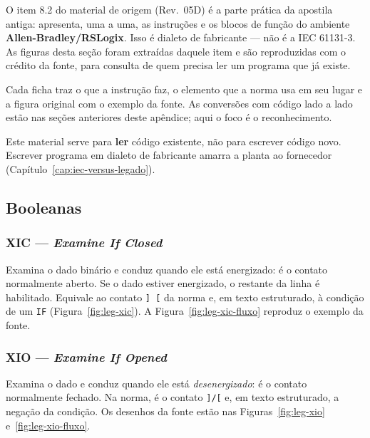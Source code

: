 O item 8.2 do material de origem (Rev.~05D) é a parte prática da apostila antiga: apresenta, uma a uma,
as instruções e os blocos de função do ambiente \textbf{Allen-Bradley/RSLogix}. Isso é dialeto de
fabricante --- não é a IEC 61131-3. As figuras desta seção foram extraídas daquele item e são
reproduzidas com o crédito da fonte, para consulta de quem precisa ler um programa que já existe.

Cada ficha traz o que a instrução faz, o elemento que a norma usa em seu lugar e a figura original com
o exemplo da fonte. As conversões com código lado a lado estão nas seções anteriores deste apêndice;
aqui o foco é o reconhecimento.

\begin{atencao}
Este material serve para \textbf{ler} código existente, não para escrever código novo. Escrever
programa em dialeto de fabricante amarra a planta ao fornecedor
(Capítulo~\ref{cap:iec-versus-legado}).
\end{atencao}

\subsection{Booleanas}

\subsubsection{XIC --- \emph{Examine If Closed}}

Examina o dado binário e conduz quando ele está energizado: é o contato normalmente aberto. Se o dado
estiver energizado, o restante da linha é habilitado. Equivale ao contato \texttt{] [} da norma e, em
texto estruturado, à condição de um \texttt{IF} (Figura~\ref{fig:leg-xic}).
A Figura~\ref{fig:leg-xic-fluxo} reproduz o exemplo da fonte.



\subsubsection{XIO --- \emph{Examine If Opened}}

Examina o dado e conduz quando ele está \emph{desenergizado}: é o contato normalmente fechado. Na
norma, é o contato \texttt{]/[} e, em texto estruturado, a negação da condição.
Os desenhos da fonte estão nas Figuras~\ref{fig:leg-xio} e~\ref{fig:leg-xio-fluxo}.

